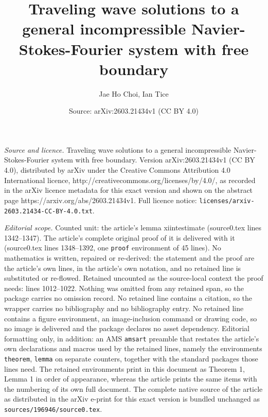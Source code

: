 \documentclass[10pt,a4paper]{amsart}
\title{Traveling wave solutions to a general incompressible Navier-Stokes-Fourier system with free boundary}
\author{Jae Ho Choi, Ian Tice}
\date{Source: arXiv:2603.21434v1 (CC BY 4.0)}
\begin{document}
\maketitle

\noindent\emph{Source and licence.} Traveling wave solutions to a general incompressible Navier-Stokes-Fourier system with free boundary. Version arXiv:2603.21434v1 (CC BY 4.0), distributed by arXiv under the Creative Commons Attribution 4.0 International licence, http://creativecommons.org/licenses/by/4.0/, as recorded in the arXiv licence metadata for this exact version and shown on the abstract page https://arxiv.org/abs/2603.21434v1. Full licence notice: \texttt{licenses/arxiv-2603.21434-CC-BY-4.0.txt}.\par\smallskip

\noindent\textit{Editorial scope.} Counted unit: the article's lemma xiintestimate (source0.tex lines 1342--1347). The article's complete original proof of it is delivered with it (source0.tex lines 1348--1392, one \texttt{proof} environment of 45 lines). No mathematics is written, repaired or re-derived: the statement and the proof are the article's own lines, in the article's own notation, and no retained line is substituted or re-flowed.  Retained uncounted as the source-local context the proof needs: lines 1012--1022.  Nothing was omitted from any retained span, so the package carries no omission record.  No retained line contains a citation, so the wrapper carries no bibliography and no bibliography entry.  No retained line contains a figure environment, an image-inclusion command or drawing code, so no image is delivered and the package declares no asset dependency.  Editorial formatting only, in addition: an AMS \texttt{amsart} preamble that restates the article's own declarations and macros used by the retained lines, namely the environments \texttt{theorem}, \texttt{lemma} on separate counters, together with the standard packages those lines need.  The retained environments print in this document as Theorem 1, Lemma 1 in order of appearance, whereas the article prints the same items with the numbering of its own full document.  The complete native source of the article as distributed in the arXiv e-print for this exact version is bundled unchanged as \texttt{sources/196946/source0.tex}.
\end{document}
